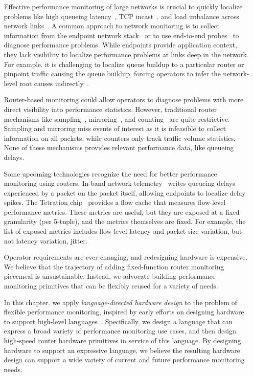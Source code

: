 Effective performance monitoring of large networks is crucial to quickly
localize problems like high queueing latency~\cite{int}, TCP
incast~\cite{tcpincast}, and load imbalance across network links~\cite{conga}.
A common approach to network monitoring is to collect information from the
endpoint network stack~\cite{minlan-snap, pathdump, trumpet} or
to use end-to-end probes~\cite{pingmesh} to diagnose performance problems.  While
endpoints provide application context, they lack visibility to localize
performance problems at links deep in the network. For example, it is
challenging to localize queue buildup to a particular router or pinpoint
traffic causing the queue buildup, forcing operators to infer the network-level
root causes indirectly~\cite{pingmesh}.

Router-based monitoring could allow operators to diagnose problems with more
direct visibility into performance statistics. However, traditional router
mechanisms like sampling~\cite{netflow, sflow}, mirroring~\cite{cisco-span,
netsight, everflow}, and counting~\cite{cormode, univmon} are quite restrictive.  Sampling
and mirroring miss events of interest as it is infeasible to collect
information on all packets, while counters only track traffic volume
statistics. None of these mechanisms provides relevant performance data, like
queueing delays.

Some upcoming technologies recognize the need for better performance monitoring
using routers. In-band network telemetry~\cite{int} writes queueing delays
experienced by a packet on the packet itself, allowing endpoints to localize
delay spikes. The Tetration chip~\cite{tetration-telemetry} provides a flow
cache that measures flow-level performance metrics.  These metrics are useful,
but they are exposed at a fixed granularity (\eg per 5-tuple), and the metrics
themselves are fixed. For example, the list of exposed metrics includes
flow-level latency and packet size variation, but not latency variation, \ie
jitter.

Operator requirements are ever-changing, and redesigning hardware is expensive.
We believe that the trajectory of adding fixed-function router monitoring
piecemeal is unsustainable. Instead, we advocate building performance
monitoring primitives that can be flexibly reused for a variety of needs.

In this chapter, we apply {\em language-directed hardware design} to the
problem of flexible performance monitoring, inspired by early efforts on
designing hardware to support high-level
languages~\cite{language-directed-computer-design, ditzel_patterson, soar}.
Specifically, we design a language that can express a broad variety of
performance monitoring use cases, and then design high-speed router hardware
primitives in service of this language. By designing hardware to support an
expressive language, we believe the resulting hardware design can support a
wide variety of current and future performance monitoring needs.


